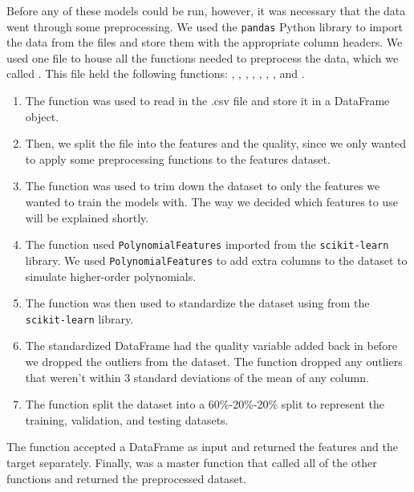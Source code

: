 Before any of these models could be run, however, it was necessary that the data went through some preprocessing. We used the \texttt{pandas} Python library to import the data from the files and store them with the appropriate column headers. We used one file to house all the functions needed to preprocess the data, which we called . This file held the following functions: , , , , , , , and .
\begin{enumerate}
    \item The  function was used to read in the .csv file and store it in a DataFrame object.
    \item Then, we split the file into the features and the quality, since we only wanted to apply some preprocessing functions to the features dataset.
    \item The  function was used to trim down the dataset to only the features we wanted to train the models with. The way we decided which features to use will be explained shortly.
    \item The  function used \texttt{PolynomialFeatures} imported from the \texttt{scikit-learn} library. We used \texttt{PolynomialFeatures} to add extra columns to the dataset to simulate higher-order polynomials.
    \item The  function was then used to standardize the dataset using  from the \texttt{scikit-learn} library.
    \item The standardized DataFrame had the quality variable added back in before we dropped the outliers from the dataset. The  function dropped any outliers that weren't within $3$ standard deviations of the mean of any column.
    \item The  function split the dataset into a 60\%-20\%-20\% split to represent the training, validation, and testing datasets.
\end{enumerate}      
The  function accepted a DataFrame as input and returned the features and the target separately. Finally,  was a master function that called all of the other functions and returned the preprocessed dataset.\\

